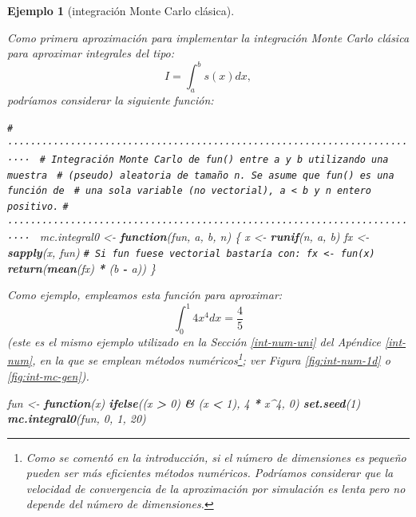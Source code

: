 \documentclass[
  spanish,
  10pt,
]{book}
\newenvironment{Shaded}{\begin{snugshade}}{\end{snugshade}}
\newcommand{\CommentTok}[1]{\textcolor[rgb]{0.56,0.35,0.01}{\textit{#1}}}
\newcommand{\ControlFlowTok}[1]{\textcolor[rgb]{0.13,0.29,0.53}{\textbf{#1}}}
\newcommand{\DecValTok}[1]{\textcolor[rgb]{0.00,0.00,0.81}{#1}}
\newcommand{\FunctionTok}[1]{\textcolor[rgb]{0.13,0.29,0.53}{\textbf{#1}}}
\newcommand{\NormalTok}[1]{#1}
\newcommand{\OtherTok}[1]{\textcolor[rgb]{0.56,0.35,0.01}{#1}}
\newcommand{\SpecialCharTok}[1]{\textcolor[rgb]{0.81,0.36,0.00}{\textbf{#1}}}
\theoremstyle{break}
\newtheorem{example}{Ejemplo}[chapter]
\theoremstyle{nonumberplain}
\renewcommand{\CommentTok}[1]{\textcolor[rgb]{0.41,0.41,0.41}{\texttt{#1}}}
\let\oldfootnote\footnote
\renewcommand\footnote[1]{\oldfootnote{\hspace{2mm}#1}}
\begin{document}
\begin{example}[integración Monte Carlo clásica]
\protect\hypertarget{exm:mc-integral-clas}{}\label{exm:mc-integral-clas}

Como primera aproximación para implementar la integración Monte Carlo clásica
para aproximar integrales del tipo:
\[I = \int_a^b s(x)  dx,\]
podríamos considerar la siguiente función:

\begin{Shaded}
\begin{Highlighting}[]
\CommentTok{\# ·········································································· }
\CommentTok{\# Integración Monte Carlo de \textasciigrave{}fun()\textasciigrave{} entre \textasciigrave{}a\textasciigrave{} y \textasciigrave{}b\textasciigrave{} utilizando una muestra }
\CommentTok{\# (pseudo) aleatoria de tamaño \textasciigrave{}n\textasciigrave{}. Se asume que \textasciigrave{}fun()\textasciigrave{} es una función de }
\CommentTok{\# una sola variable (no vectorial), \textasciigrave{}a \textless{} b\textasciigrave{} y \textasciigrave{}n\textasciigrave{} entero positivo.}
\CommentTok{\# ·········································································· }
\NormalTok{mc.integral0 }\OtherTok{\textless{}{-}} \ControlFlowTok{function}\NormalTok{(fun, a, b, n) \{}
\NormalTok{  x }\OtherTok{\textless{}{-}} \FunctionTok{runif}\NormalTok{(n, a, b)}
\NormalTok{  fx }\OtherTok{\textless{}{-}} \FunctionTok{sapply}\NormalTok{(x, fun) }\CommentTok{\# Si fun fuese vectorial bastaría con: fx \textless{}{-} fun(x)}
  \FunctionTok{return}\NormalTok{(}\FunctionTok{mean}\NormalTok{(fx) }\SpecialCharTok{*}\NormalTok{ (b }\SpecialCharTok{{-}}\NormalTok{ a))}
\NormalTok{\}}
\end{Highlighting}
\end{Shaded}

Como ejemplo, empleamos esta función para aproximar:
\[\int_0^1 4x^4 dx = \frac{4}{5}\]
(este es el mismo ejemplo utilizado en la Sección \ref{int-num-uni} del Apéndice \ref{int-num},
en la que se emplean métodos numéricos\footnote{Como se comentó en la introducción, si el número de dimensiones es pequeño pueden ser más eficientes métodos numéricos. Podríamos considerar que la velocidad de convergencia de la aproximación por simulación es lenta pero no depende del número de dimensiones.}; ver Figura \ref{fig:int-num-1d} o \ref{fig:int-mc-gen}).

\begin{Shaded}
\begin{Highlighting}[]
\NormalTok{fun }\OtherTok{\textless{}{-}} \ControlFlowTok{function}\NormalTok{(x) }\FunctionTok{ifelse}\NormalTok{((x }\SpecialCharTok{\textgreater{}} \DecValTok{0}\NormalTok{) }\SpecialCharTok{\&}\NormalTok{ (x }\SpecialCharTok{\textless{}} \DecValTok{1}\NormalTok{), }\DecValTok{4} \SpecialCharTok{*}\NormalTok{ x}\SpecialCharTok{\^{}}\DecValTok{4}\NormalTok{, }\DecValTok{0}\NormalTok{)}
\FunctionTok{set.seed}\NormalTok{(}\DecValTok{1}\NormalTok{)}
\FunctionTok{mc.integral0}\NormalTok{(fun, }\DecValTok{0}\NormalTok{, }\DecValTok{1}\NormalTok{, }\DecValTok{20}\NormalTok{)}
\end{Highlighting}
\end{Shaded}


\end{example}
\end{document}
